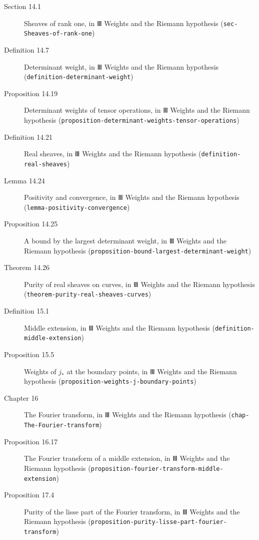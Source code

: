 \documentclass[11pt]{article}
\newcommand{\bpslug}[1]{\texttt{#1}}
\begin{document}
\begin{description}
\item[Section 14.1] Sheaves of rank one, in Ⅲ Weights and the Riemann hypothesis (\bpslug{sec-{}\allowbreak{}Sheaves-{}\allowbreak{}of-{}\allowbreak{}rank-{}\allowbreak{}one})
\item[Definition 14.7] Determinant weight, in Ⅲ Weights and the Riemann hypothesis (\bpslug{definition-{}\allowbreak{}determinant-{}\allowbreak{}weight})
\item[Proposition 14.19] Determinant weights of tensor operations, in Ⅲ Weights and the Riemann hypothesis (\bpslug{proposition-{}\allowbreak{}determinant-{}\allowbreak{}weights-{}\allowbreak{}tensor-{}\allowbreak{}operations})
\item[Definition 14.21] Real sheaves, in Ⅲ Weights and the Riemann hypothesis (\bpslug{definition-{}\allowbreak{}real-{}\allowbreak{}sheaves})
\item[Lemma 14.24] Positivity and convergence, in Ⅲ Weights and the Riemann hypothesis (\bpslug{lemma-{}\allowbreak{}positivity-{}\allowbreak{}convergence})
\item[Proposition 14.25] A bound by the largest determinant weight, in Ⅲ Weights and the Riemann hypothesis (\bpslug{proposition-{}\allowbreak{}bound-{}\allowbreak{}largest-{}\allowbreak{}determinant-{}\allowbreak{}weight})
\item[Theorem 14.26] Purity of real sheaves on curves, in Ⅲ Weights and the Riemann hypothesis (\bpslug{theorem-{}\allowbreak{}purity-{}\allowbreak{}real-{}\allowbreak{}sheaves-{}\allowbreak{}curves})
\item[Definition 15.1] Middle extension, in Ⅲ Weights and the Riemann hypothesis (\bpslug{definition-{}\allowbreak{}middle-{}\allowbreak{}extension})
\item[Proposition 15.5] Weights of $j_*$ at the boundary points, in Ⅲ Weights and the Riemann hypothesis (\bpslug{proposition-{}\allowbreak{}weights-{}\allowbreak{}j-{}\allowbreak{}boundary-{}\allowbreak{}points})
\item[Chapter 16] The Fourier transform, in Ⅲ Weights and the Riemann hypothesis (\bpslug{chap-{}\allowbreak{}The-{}\allowbreak{}Fourier-{}\allowbreak{}transform})
\item[Proposition 16.17] The Fourier transform of a middle extension, in Ⅲ Weights and the Riemann hypothesis (\bpslug{proposition-{}\allowbreak{}fourier-{}\allowbreak{}transform-{}\allowbreak{}middle-{}\allowbreak{}extension})
\item[Proposition 17.4] Purity of the lisse part of the Fourier transform, in Ⅲ Weights and the Riemann hypothesis (\bpslug{proposition-{}\allowbreak{}purity-{}\allowbreak{}lisse-{}\allowbreak{}part-{}\allowbreak{}fourier-{}\allowbreak{}transform})

\end{description}
\end{document}
